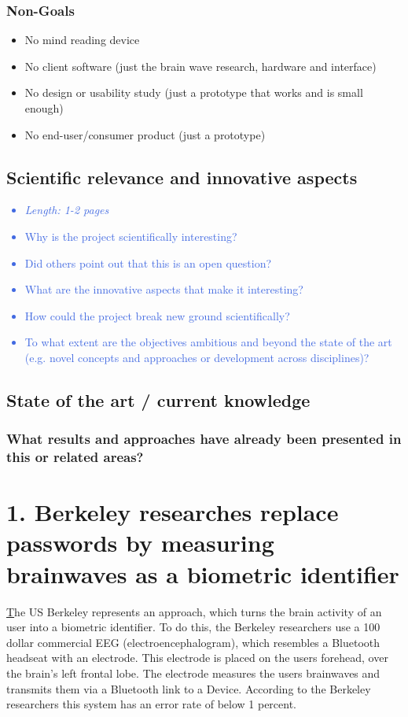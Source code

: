 \documentclass[a4paper,11pt]{article}
\providecommand*{\note}[1]{\small \textcolor{RoyalBlue}{\begin{minipage}{\textwidth}{#1}\end{minipage}}}
\begin{document}
\subsection{Non-Goals}
\begin{itemize}
	\item No mind reading device
	\item No client software (just the brain wave research, hardware and interface)
	\item No design or usability study (just a prototype that works and is small enough)
	\item No end-user/consumer product (just a prototype)
\end{itemize}


\section{Scientific relevance and innovative aspects}
\label{sect:relevance}

\note{
\begin{itemize}
\item {\em Length: 1-2 pages}
\item Why is the project scientifically interesting?
\item Did others point out that this is an open question?
\item What are the innovative aspects that make it interesting?
\item How could the project break new ground scientifically?
\item To what extent are the objectives ambitious and beyond the state of the art (e.g. novel concepts and approaches or development across disciplines)?
\end{itemize}
}

\section{State of the art / current knowledge}
\label{sect:star}
\subsection{What results and approaches have already been presented in this or related areas?}
\chapter{1. Berkeley researches replace passwords by measuring brainwaves as a biometric identifier}
\href{http://people.ischool.berkeley.edu/~chuang/pubs/usec13.pdf}
The US Berkeley represents an approach, which turns the brain activity of an user into a biometric identifier. To do this, the Berkeley researchers use a 100 dollar commercial EEG (electroencephalogram), which resembles a Bluetooth headseat with an electrode. This electrode is placed on the users forehead, over the brain's left frontal lobe. The electrode measures the users brainwaves and transmits them via a Bluetooth link to a Device. According to the Berkeley researchers this system has an error rate of below 1 percent.
\end{document}
